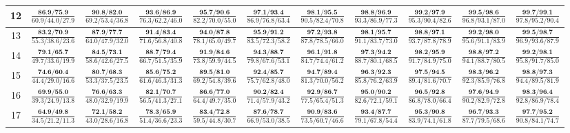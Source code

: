 \documentclass{slides}
\begin{document}
{{{\begin{tabular}{|c|c|c|c|c|c|c|c|c|c|c|}
\hline
12 & $\frac{\textbf{86.9/75.9}}{60.9/44.0/27.9}$ & $\frac{\textbf{90.8/82.0}}{69.2/53.4/36.8}$ & $\frac{\textbf{93.6/86.9}}{76.3/62.2/46.0}$ & $\frac{\textbf{95.7/90.6}}{82.2/70.0/55.0}$ & $\frac{\textbf{97.1/93.4}}{86.9/76.8/63.4}$ & $\frac{\textbf{98.1/95.5}}{90.5/82.4/70.8}$ & $\frac{\textbf{98.8/96.9}}{93.3/86.9/77.3}$ & $\frac{\textbf{99.2/97.9}}{95.3/90.4/82.6}$ & $\frac{\textbf{99.5/98.6}}{96.8/93.1/87.0}$ & $\frac{\textbf{99.7/99.1}}{97.8/95.2/90.4}$ \\
\hline
13 & $\frac{\textbf{83.2/70.9}}{55.3/38.6/23.6}$ & $\frac{\textbf{87.9/77.7}}{64.0/47.9/32.0}$ & $\frac{\textbf{91.4/83.4}}{71.6/56.8/40.8}$ & $\frac{\textbf{94.0/87.8}}{78.1/65.0/49.7}$ & $\frac{\textbf{95.9/91.2}}{83.5/72.3/58.2}$ & $\frac{\textbf{97.2/93.8}}{87.8/78.5/66.0}$ & $\frac{\textbf{98.1/95.7}}{91.1/83.7/73.0}$ & $\frac{\textbf{98.8/97.1}}{93.7/87.8/78.9}$ & $\frac{\textbf{99.2/98.0}}{95.6/91.1/83.9}$ & $\frac{\textbf{99.5/98.7}}{96.9/93.6/87.9}$ \\
\hline
14 & $\frac{\textbf{79.1/65.7}}{49.7/33.6/19.9}$ & $\frac{\textbf{84.5/73.1}}{58.6/42.6/27.5}$ & $\frac{\textbf{88.7/79.4}}{66.7/51.5/35.9}$ & $\frac{\textbf{91.9/84.6}}{73.8/59.9/44.5}$ & $\frac{\textbf{94.3/88.7}}{79.8/67.6/53.1}$ & $\frac{\textbf{96.1/91.8}}{84.7/74.4/61.2}$ & $\frac{\textbf{97.3/94.2}}{88.7/80.1/68.5}$ & $\frac{\textbf{98.2/95.9}}{91.7/84.9/75.0}$ & $\frac{\textbf{98.8/97.2}}{94.1/88.7/80.5}$ & $\frac{\textbf{99.2/98.1}}{95.8/91.7/85.0}$ \\
\hline
15 & $\frac{\textbf{74.6/60.4}}{44.4/29.0/16.6}$ & $\frac{\textbf{80.7/68.3}}{53.3/37.5/23.5}$ & $\frac{\textbf{85.6/75.2}}{61.6/46.3/31.3}$ & $\frac{\textbf{89.5/81.0}}{69.2/54.8/39.6}$ & $\frac{\textbf{92.4/85.7}}{75.7/62.8/48.0}$ & $\frac{\textbf{94.7/89.4}}{81.3/70.0/56.2}$ & $\frac{\textbf{96.3/92.3}}{85.8/76.2/63.9}$ & $\frac{\textbf{97.5/94.5}}{89.4/81.6/70.7}$ & $\frac{\textbf{98.3/96.2}}{92.3/85.9/76.8}$ & $\frac{\textbf{98.8/97.3}}{94.4/89.5/81.9}$ \\
\hline
16 & $\frac{\textbf{69.9/55.0}}{39.3/24.9/13.8}$ & $\frac{\textbf{76.6/63.3}}{48.0/32.9/19.9}$ & $\frac{\textbf{82.1/70.7}}{56.5/41.3/27.1}$ & $\frac{\textbf{86.6/77.0}}{64.4/49.7/35.0}$ & $\frac{\textbf{90.2/82.4}}{71.4/57.9/43.2}$ & $\frac{\textbf{92.9/86.7}}{77.5/65.4/51.3}$ & $\frac{\textbf{95.0/90.2}}{82.6/72.1/59.1}$ & $\frac{\textbf{96.5/92.8}}{86.8/78.0/66.4}$ & $\frac{\textbf{97.6/94.9}}{90.2/82.9/72.8}$ & $\frac{\textbf{98.3/96.4}}{92.8/86.9/78.4}$ \\
\hline
17 & $\frac{\textbf{64.9/49.8}}{34.5/21.2/11.3}$ & $\frac{\textbf{72.1/58.2}}{43.0/28.6/16.8}$ & $\frac{\textbf{78.3/65.9}}{51.4/36.6/23.3}$ & $\frac{\textbf{83.4/72.8}}{59.5/44.8/30.7}$ & $\frac{\textbf{87.6/78.7}}{66.9/53.0/38.5}$ & $\frac{\textbf{90.9/83.6}}{73.5/60.7/46.6}$ & $\frac{\textbf{93.4/87.7}}{79.1/67.8/54.4}$ & $\frac{\textbf{95.3/90.8}}{83.9/74.1/61.8}$ & $\frac{\textbf{96.7/93.3}}{87.7/79.5/68.6}$ & $\frac{\textbf{97.7/95.2}}{90.8/84.1/74.7}$ \\

\end{tabular}}}}
\end{document}
